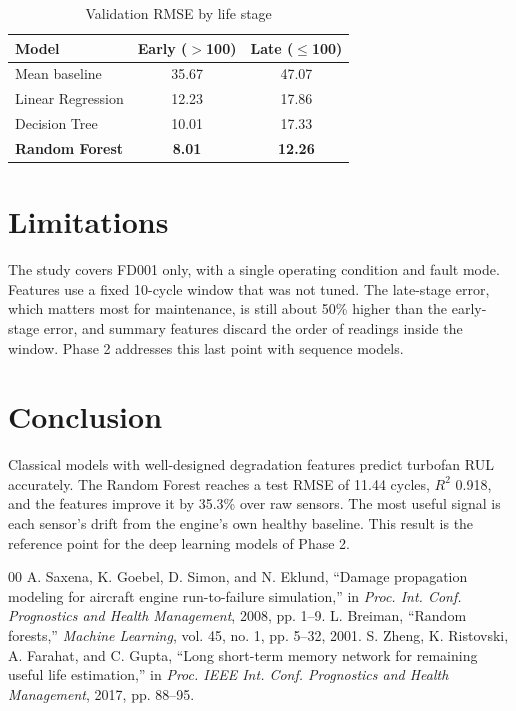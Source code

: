 \documentclass[conference]{IEEEtran}
\begin{document}
\begin{table}[!t]
\caption{Validation RMSE by life stage}
\label{tabIII}
\centering
\footnotesize
\begin{tabular}{lcc}
\toprule
Model & Early ($>$100) & Late ($\le$100) \\
\midrule
Mean baseline & 35.67 & 47.07 \\
Linear Regression & 12.23 & 17.86 \\
Decision Tree & 10.01 & 17.33 \\
\textbf{Random Forest} & \textbf{8.01} & \textbf{12.26} \\
\bottomrule
\end{tabular}
\end{table}


\section{Limitations}
The study covers FD001 only, with a single operating condition and fault mode. Features use a fixed 10-cycle window that was not tuned. The late-stage error, which matters most for maintenance, is still about 50\% higher than the early-stage error, and summary features discard the order of readings inside the window. Phase 2 addresses this last point with sequence models.


\section{Conclusion}
Classical models with well-designed degradation features predict turbofan RUL accurately. The Random Forest reaches a test RMSE of 11.44 cycles, $R^2$ 0.918, and the features improve it by 35.3\% over raw sensors. The most useful signal is each sensor's drift from the engine's own healthy baseline. This result is the reference point for the deep learning models of Phase 2.


\begin{thebibliography}{00}
 A. Saxena, K. Goebel, D. Simon, and N. Eklund, ``Damage propagation modeling for aircraft engine run-to-failure simulation,'' in \textit{Proc. Int. Conf. Prognostics and Health Management}, 2008, pp. 1--9.
 L. Breiman, ``Random forests,'' \textit{Machine Learning}, vol. 45, no. 1, pp. 5--32, 2001.
 S. Zheng, K. Ristovski, A. Farahat, and C. Gupta, ``Long short-term memory network for remaining useful life estimation,'' in \textit{Proc. IEEE Int. Conf. Prognostics and Health Management}, 2017, pp. 88--95.
\end{thebibliography}
\end{document}
